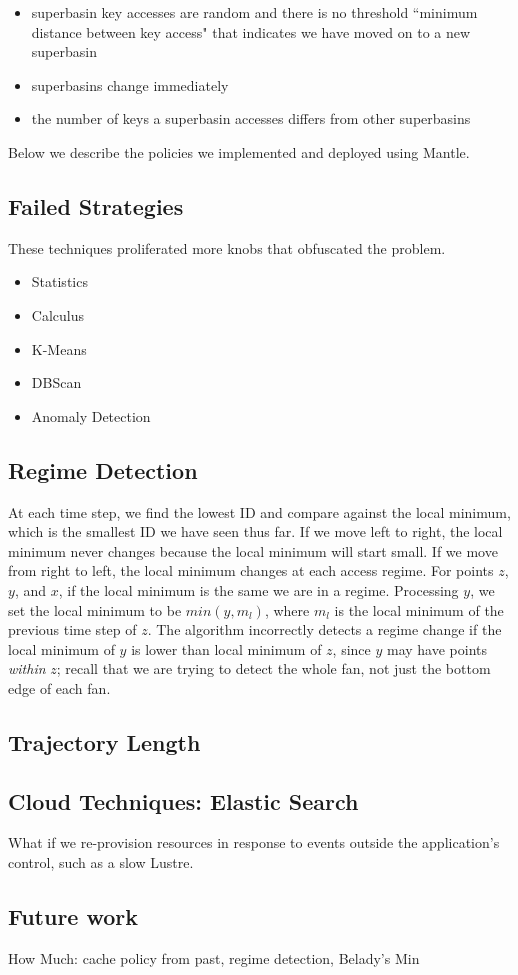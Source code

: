 \begin{itemize}

  \item superbasin key accesses are random and there is no threshold ``minimum distance
  between key access" that indicates we have moved on to a new superbasin

  \item superbasins change immediately

  \item the number of keys a superbasin accesses differs from other superbasins

\end{itemize}

Below we describe the policies we implemented and deployed using Mantle. 

\subsection{Failed Strategies}
These techniques proliferated more knobs that obfuscated the problem. 
\begin{itemize}
  \item Statistics
  \item Calculus
  \item K-Means
  \item DBScan
  \item Anomaly Detection
\end{itemize}

\subsection{Regime Detection}

At each time step, we find the lowest ID and compare against the local minimum,
which is the smallest ID we have seen thus far. If we move left to right, the
local minimum never changes because the local minimum will start small. If we
move from right to left, the local minimum changes at each access regime.  For
points \(z\), \(y\), and \(x\), if the local minimum is the same we are in a
regime. Processing \(y\), we set the local minimum to be \(min(y, m_l)\), where
\(m_l\) is the local minimum of the previous time step of \(z\). The algorithm
incorrectly detects a regime change if the local minimum of \(y\) is lower than
local minimum of \(z\), since \(y\) may have points {\it within} \(z\); recall
that we are trying to detect the whole fan, not just the bottom edge of each
fan.

\subsection{Trajectory Length}

\subsection{Cloud Techniques: Elastic Search}

What if we re-provision resources in response to events outside the
application's control, such as a slow Lustre.

\subsection{Future work}

How Much: cache policy from past, regime detection, Belady's Min
